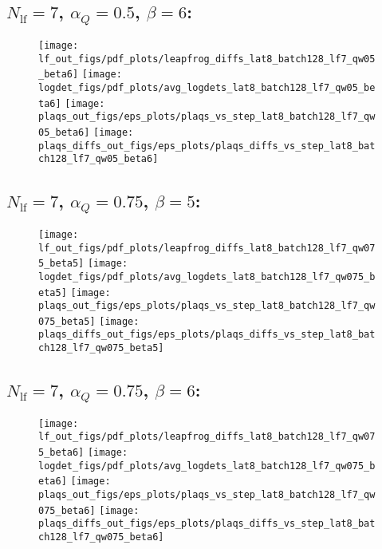 \clearpage
\subsection{\texorpdfstring{$N_{\mathrm{lf}} = 7$}{Nlf = 7}, \texorpdfstring{$\alpha_Q = 0.5$}{alphaq = 0.5},
\texorpdfstring{$\beta = 6$}{beta = 6}:}
%
\begin{figure}[htpb]
  \centering
  \texttt{[image: lf\_out\_figs/pdf\_plots/leapfrog\_diffs\_lat8\_batch128\_lf7\_qw05\_beta6]}
  \hfill
  \texttt{[image: logdet\_figs/pdf\_plots/avg\_logdets\_lat8\_batch128\_lf7\_qw05\_beta6]}
  \hfill
  \texttt{[image: plaqs\_out\_figs/eps\_plots/plaqs\_vs\_step\_lat8\_batch128\_lf7\_qw05\_beta6]}
  \hfill
  \texttt{[image: plaqs\_diffs\_out\_figs/eps\_plots/plaqs\_diffs\_vs\_step\_lat8\_batch128\_lf7\_qw05\_beta6]}
\end{figure}

\clearpage
\subsection{\texorpdfstring{$N_{\mathrm{lf}} = 7$}{Nlf = 7}, \texorpdfstring{$\alpha_Q = 0.75$}{alphaq = 0.75},
\texorpdfstring{$\beta = 5$}{beta = 5}:}
%
\begin{figure}[htpb]
  \centering
  \texttt{[image: lf\_out\_figs/pdf\_plots/leapfrog\_diffs\_lat8\_batch128\_lf7\_qw075\_beta5]}
  \hfill
  \texttt{[image: logdet\_figs/pdf\_plots/avg\_logdets\_lat8\_batch128\_lf7\_qw075\_beta5]}
  \hfill
  \texttt{[image: plaqs\_out\_figs/eps\_plots/plaqs\_vs\_step\_lat8\_batch128\_lf7\_qw075\_beta5]}
  \hfill
  \texttt{[image: plaqs\_diffs\_out\_figs/eps\_plots/plaqs\_diffs\_vs\_step\_lat8\_batch128\_lf7\_qw075\_beta5]}
\end{figure}

\clearpage
\subsection{\texorpdfstring{$N_{\mathrm{lf}} = 7$}{Nlf = 7}, \texorpdfstring{$\alpha_Q = 0.75$}{alphaq = 0.75},
\texorpdfstring{$\beta = 6$}{beta = 6}:}
%
\begin{figure}[htpb]
  \centering
  \texttt{[image: lf\_out\_figs/pdf\_plots/leapfrog\_diffs\_lat8\_batch128\_lf7\_qw075\_beta6]}
  \hfill
  \texttt{[image: logdet\_figs/pdf\_plots/avg\_logdets\_lat8\_batch128\_lf7\_qw075\_beta6]}
  \hfill
  \texttt{[image: plaqs\_out\_figs/eps\_plots/plaqs\_vs\_step\_lat8\_batch128\_lf7\_qw075\_beta6]}
  \hfill
  \texttt{[image: plaqs\_diffs\_out\_figs/eps\_plots/plaqs\_diffs\_vs\_step\_lat8\_batch128\_lf7\_qw075\_beta6]}
\end{figure}

